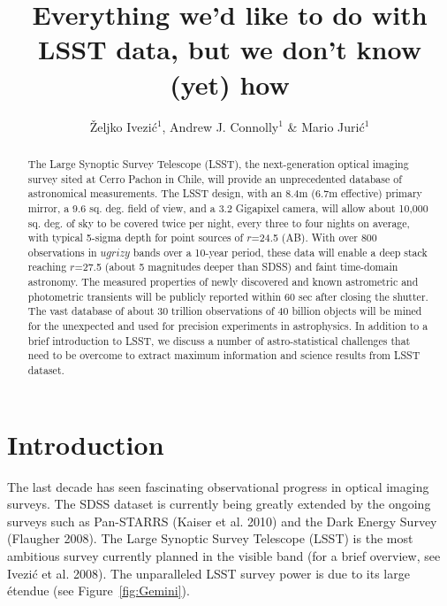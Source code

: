 \documentclass{iau}
\title[Everything we’d like to do with LSST data, but we don’t know (yet) how] %
{Everything we'd like to do with LSST data, but we don't know (yet) how}
\author[Ivezi\'{c}, Connolly\'{c} \& Juri\'{c}]   %
{\v{Z}eljko Ivezi\'{c}$^1$, Andrew J. Connolly$^1$ \& Mario Juri\'{c}$^1$
}
\affiliation{
$^1$ Department of Astronomy, University of Washington, \\ Box 351580, Seattle, WA 98195-1580, USA\\ 
                               email: {\tt ivezic@astro.washington.edu}
}
\begin{document}
 
\maketitle

\begin{abstract}
The Large Synoptic Survey Telescope (LSST), the next-generation optical imaging survey 
sited at Cerro Pachon in Chile, will provide an unprecedented database of astronomical
measurements. The LSST design, with an 8.4m (6.7m effective) primary mirror, a 9.6 sq. deg.
field of view, and a 3.2 Gigapixel camera, will allow about 10,000 sq. deg. of sky to be 
covered twice per night, every three to four nights on average, with typical 5-sigma depth 
for point sources of  $r$=24.5 (AB). With over 800 observations in $ugrizy$ bands over a 
10-year period, these data will enable a deep stack reaching $r$=27.5 (about 5 magnitudes 
deeper than SDSS) and faint time-domain astronomy. The measured properties of newly 
discovered and known astrometric and photometric transients will be publicly reported 
within 60 sec after closing the shutter. The vast database of about 30 trillion observations 
of 40 billion objects will be mined for the unexpected and used for precision experiments 
in astrophysics. In addition to a brief introduction to LSST, we discuss a number of 
astro-statistical challenges that need to be overcome to extract maximum information 
and science results from LSST dataset.  
\end{abstract}

\firstsection %


\section{Introduction \label{sec:lsst}}

The last decade has seen fascinating observational progress in optical imaging surveys.
The SDSS dataset is currently being greatly extended by the ongoing surveys such as 
Pan-STARRS (Kaiser et al. 2010) and the Dark Energy Survey (Flaugher 2008). The Large Synoptic 
Survey Telescope (LSST)  is the most ambitious survey currently planned in the visible band
(for a brief overview, see Ivezi\'{c} et al. 2008). The unparalleled LSST survey power is due to 
its large \'etendue (see Figure~\ref{fig:Gemini}). 
\end{document}

